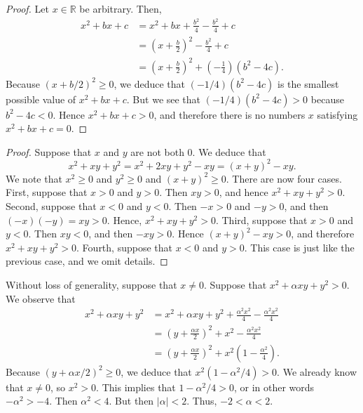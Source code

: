 \begin{proof}
	Let $x \in \mathbb{R}$ be arbitrary. Then,
	\begin{align*}
		x^2 + b x + c & = x^2 + b x + \frac{b^2}{4} - \frac{b^2}{4} + c                              \\
		              & = \left( x + \frac{b}{2} \right)^2 - \frac{b^2}{4} + c                       \\
		              & = \left( x + \frac{b}{2} \right)^2 + \left( -\frac{1}{4} \right)(b^2 - 4 c).
	\end{align*}
	Because $(x + b/2)^2 \geq 0$, we deduce that $(-1/4)(b^2 - 4 c)$ is the smallest possible value of $x^2 + b x + c$. But we see that $(-1/4)(b^2 - 4 c) > 0$ because $b^2 - 4 c < 0$. Hence $x^2 + b x + c > 0$, and therefore there is no numbers $x$ satisfying $x^2 + b x + c = 0$.
\end{proof}

\begin{proof}
	Suppose that $x$ and $y$ are not both 0. We deduce that
	$$
		x^2 + x y + y^2 = x^2 + 2 x y + y^2 - x y = (x + y)^2 - x y.
	$$
	We note that $x^2 \geq 0$ and $y^2 \geq 0$ and $(x + y)^2 \geq 0$. There are now four cases. First, suppose that $x > 0$ and $y > 0$. Then $x y > 0$, and hence $x^2 + x y + y^2 > 0$. Second, suppose that $x < 0$ and $y < 0$. Then $-x > 0$ and $-y > 0$, and then $(-x)(-y) = x y > 0$. Hence, $x^2 + x y + y^2 > 0$. Third, suppose that $x > 0$ and $y < 0$. Then $x y < 0$, and then $-x y > 0$. Hence $(x + y)^2 - x y > 0$, and therefore $x^2 + x y + y^2 > 0$. Fourth, suppose that $x < 0$ and $y > 0$. This case is just like the previous case, and we omit details.
\end{proof}

Without loss of generality, suppose that $x \neq 0$. Suppose that $x^2 + \alpha x y + y^2 > 0$. We observe that
\begin{align*}
	x^2 + \alpha x y + y^2 & = x^2 + \alpha x y + y^2 + \frac{\alpha^2 x^2}{4} - \frac{\alpha^2 x^2}{4}             \\
	                       & = \left( y + \frac{\alpha x}{2} \right)^2 + x^2 - \frac{\alpha^2 x^2}{4}               \\
	                       & = \left( y + \frac{\alpha x}{2} \right)^2 + x^2 \left( 1 - \frac{\alpha^2}{4} \right).
\end{align*}
Because $(y + \alpha x / 2)^2 \geq 0$, we deduce that $x^2 ( 1 - \alpha^2/4 ) > 0$. We already know that $x \neq 0$, so $x^2 > 0$. This implies that $1 - \alpha^2/4 > 0$, or in other words $- \alpha^2 > -4$. Then $\alpha^2 < 4$. But then $|\alpha| < 2$. Thus, $-2 < \alpha < 2$.

